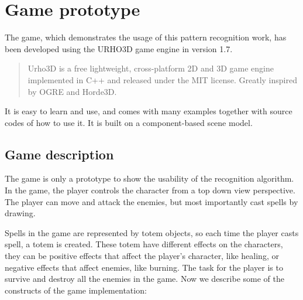 \section{Game prototype}
The game, which demonstrates the usage of this pattern recognition work, has been developed using the URHO3D game engine in version 1.7. \begin{quotation} Urho3D is a free lightweight, cross-platform 2D and 3D game engine implemented in C++ and released under the MIT license. Greatly inspired by OGRE and Horde3D. \end{quotation} It is easy to learn and use, and comes with many examples together with source codes of how to use it. It is built on a component-based scene model. 

\subsection{Game description}
The game is only a prototype to show the usability of the recognition algorithm. In the game, the player controls the character from a top down view perspective. The player can move and attack the enemies, but most importantly cast spells by drawing. 

Spells in the game are represented by totem objects, so each time the player casts spell, a totem is created. These totem have different effects on the characters, they can be positive effects that affect the player's character, like healing, or negative effects that affect enemies, like burning. The task for the player is to survive and destroy all the enemies in the game. 
Now we describe some of the constructs of the game implementation:

